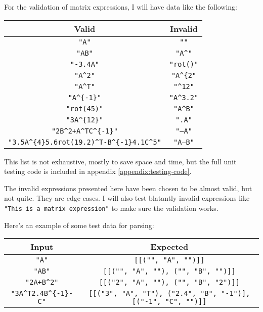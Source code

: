 \documentclass[../main.tex]{subfiles}
\begin{document}
For the validation of matrix expressions, I will have data like the following:
\begin{center}
\begin{tabular}{|c|c|}
\hline
Valid & Invalid\\
\hline
\texttt{"A"} & \texttt{""}\\
\hline
\texttt{"AB"} & \texttt{"A\textasciicircum"}\\
\hline
\texttt{"-3.4A"} & \texttt{"rot()"}\\
\hline
\texttt{"A\textasciicircum2"} & \texttt{"A\textasciicircum\{2"}\\
\hline
\texttt{"A\textasciicircum T"} & \texttt{"\textasciicircum12"}\\
\hline
\texttt{"A\textasciicircum\{-1\}"} & \texttt{"A\textasciicircum3.2"}\\
\hline
\texttt{"rot(45)"} & \texttt{"A\textasciicircum B"}\\
\hline
\texttt{"3A\textasciicircum\{12\}"} & \texttt{".A"}\\
\hline
\texttt{"2B\textasciicircum2+A\textasciicircum TC\textasciicircum\{-1\}"} & \texttt{"--A"}\\
\hline
\texttt{"3.5A\textasciicircum\{4\}5.6rot(19.2)\textasciicircum T-B\textasciicircum\{-1\}4.1C\textasciicircum5"} & \texttt{"A--B"}\\
\hline
\end{tabular}
\end{center}

This list is not exhaustive, mostly to save space and time, but the full unit testing code is included in appendix \ref{appendix:testing-code}.

The invalid expressions presented here have been chosen to be almost valid, but not quite. They are edge cases. I will also test blatantly invalid expressions like \texttt{"This is a matrix expression"} to make sure the validation works.

Here's an example of some test data for parsing:\vspace{-1em}
\begin{center}
\begin{tabular}{|c|c|}
\hline
Input & Expected\\
\hline
\texttt{"A"} & \texttt{[[("", "A", "")]]}\\
\hline
\texttt{"AB"} & \texttt{[[("", "A", ""), ("", "B", "")]]}\\
\hline
\texttt{"2A+B\textasciicircum2"} & \texttt{[[("2", "A", ""), ("", "B", "2")]]}\\
\hline
\texttt{"3A\textasciicircum T2.4B\textasciicircum\{-1\}-C"} & \texttt{[[("3", "A", "T"), ("2.4", "B", "-1")], [("-1", "C", "")]]}\\
\hline
\end{tabular}
\end{center}
\end{document}
